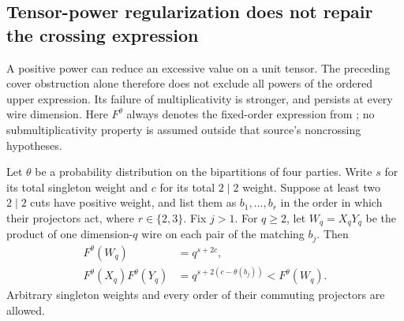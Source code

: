 \subsection{Tensor-power regularization does not repair the crossing expression}

A positive power can reduce an excessive value on a unit tensor.
The preceding cover obstruction alone therefore does not exclude
all powers of the ordered upper expression. Its failure of
multiplicativity is stronger, and persists at every wire dimension.
Here $F^\theta$ always denotes the fixed-order expression from
\cite[Definition~3.3]{cvz-universal}; no submultiplicativity property
is assumed outside that source's noncrossing hypotheses.

\begin{proposition}
\label{prop:upper-matching-wires}
Let $\theta$ be a probability distribution on the bipartitions of
four parties. Write $s$ for its total singleton weight and $c$
for its total $2\mid2$ weight. Suppose at least two $2\mid2$
cuts have positive weight, and list them as $b_1,\ldots,b_r$
in the order in which their projectors act, where $r\in\{2,3\}$.
Fix $j>1$. For $q\ge2$, let $W_q=X_qY_q$ be the product of
one dimension-$q$ wire on each pair of the matching $b_j$.
Then
\begin{align}
 F^\theta(W_q)&=q^{s+2c},\label{eq:upper-matching-value}\\
 F^\theta(X_q)F^\theta(Y_q)
   &=q^{s+2(c-\theta(b_j))}<F^\theta(W_q).
 \label{eq:upper-matching-gap}
\end{align}
Arbitrary singleton weights and every order of their commuting
projectors are allowed.
\end{proposition}
